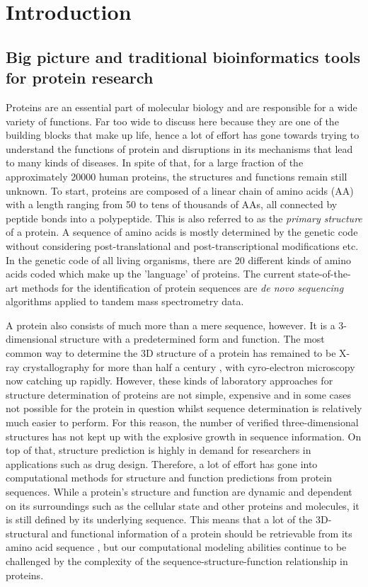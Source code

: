 \chapter[Introduction]%
{Introduction}
\section{Big picture and traditional bioinformatics tools for protein research}
Proteins are an essential part of molecular biology and are responsible for a wide variety of functions. Far too wide to discuss here because they are one of the building blocks that make up life, hence a lot of effort has gone towards trying to understand the functions of protein and disruptions in its mechanisms that lead to many kinds of diseases. In spite of that, for a large fraction of the approximately 20000 human proteins, the structures and functions remain still unknown. To start, proteins are composed of a linear chain of amino acids (AA) with a length ranging from 50 to tens of thousands of AAs, all connected by peptide bonds into a polypeptide. This is also referred to as the \textit{primary structure} of a protein.\cite{primstruct} A sequence of amino acids is mostly determined by the genetic code without considering post-translational and post-transcriptional modifications etc. In the genetic code of all living organisms, there are 20 different kinds of amino acids coded which make up the 'language' of proteins. The current state-of-the-art methods for the identification of protein sequences are \textit{de novo sequencing} algorithms applied to tandem mass spectrometry data.\cite{protseq}

A protein also consists of much more than a mere sequence, however. It is a 3-dimensional structure with a predetermined form and function. The most common way to determine the 3D structure of a protein has remained to be X-ray crystallography for more than half a century \cite{xray}, with cyro-electron microscopy now catching up rapidly.\cite{cyroem} However, these kinds of laboratory approaches for structure determination of proteins are not simple, expensive and in some cases not possible for the protein in question whilst sequence determination is relatively much easier to perform. For this reason, the number of verified three-dimensional structures has not kept up with the explosive growth in sequence information. On top of that, structure prediction is highly in demand for researchers in applications such as drug design. Therefore, a lot of effort has gone into computational methods for structure and function predictions from protein sequences. While a protein's structure and function are dynamic and dependent on its surroundings such as the cellular state and other proteins and molecules, it is still defined by its underlying sequence. This means that a lot of the 3D-structural and functional information of a protein should be retrievable from its amino acid sequence \cite{structure}, but our computational modeling abilities continue to be challenged by the complexity of the sequence-structure-function relationship in proteins.

